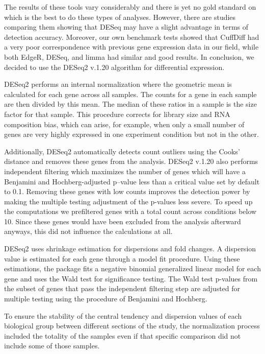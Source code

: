 The results of these tools vary considerably and there is yet no gold standard on which is the best to do these types of analyses. However, there are studies comparing them showing that DESeq may have a slight advantage in terms of detection accuracy.\cite{Seyednasrollah2015} Moreover, our own benchmark tests showed that CuffDiff had a very poor correspondence with previous gene expression data in our field, while both EdgeR, DESeq, and limma had similar and good results. In conclusion, we decided to use the DESeq2 v.1.20 algorithm for differential expression.\cite{Love2014}

DESeq2 performs an internal normalization where the geometric mean is calculated for each gene across all samples. The counts for a gene in each sample are then divided by this mean. The median of these ratios in a sample is the size factor for that sample. This procedure corrects for library size and RNA composition bias, which can arise, for example, when only a small number of genes are very highly expressed in one experiment condition but not in the other.

Additionally, DESeq2 automatically detects count outliers using the Cooks' distance and removes these genes from the analysis. DESeq2 v.1.20 also performs independent filtering which maximizes the number of genes which will have a Benjamini and Hochberg-adjusted p–value\cite{Benjamini1995} less than a critical value set by default to 0.1. Removing these genes with low counts improves the detection power by making the multiple testing adjustment of the p-values less severe. To speed up the computations we prefiltered genes with a total count across conditions below 10. Since these genes would have been excluded from the analysis afterward anyways, this did not influence the calculations at all.

DESeq2 uses shrinkage estimation for dispersions and fold changes. A dispersion value is estimated for each gene through a model fit procedure. Using these estimations, the package fits a negative binomial generalized linear model for each gene and uses the Wald test for significance testing. The Wald test p-values from the subset of genes that pass the independent filtering step are adjusted for multiple testing using the procedure of Benjamini and Hochberg.\cite{Benjamini1995}

To ensure the stability of the central tendency and dispersion values of each biological group between different sections of the study, the normalization process included the totality of the samples even if that specific comparison did not include some of those samples.

